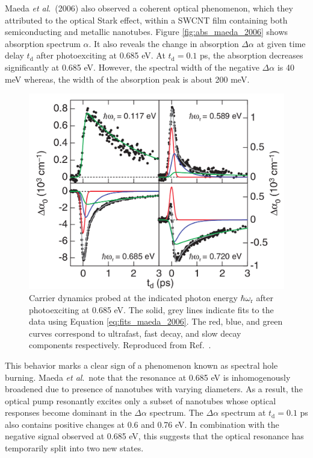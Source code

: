 \clearpage

Maeda \textit{et al}.\ (2006) also observed a coherent optical phenomenon, which they attributed to the optical Stark effect, within a SWCNT film containing both semiconducting and metallic nanotubes. Figure \ref{fig:abs_maeda_2006} shows absorption spectrum $\alpha$. It also reveals the change in absorption $\Delta \alpha$ at given time delay $t_\text{d}$ after photoexciting at 0.685 eV. At $t_\text{d} = 0.1$ ps, the absorption decreases significantly at 0.685 eV. However, the spectral width of the negative $\Delta\alpha$ is 40 meV whereas, the width of the absorption peak is about 200 meV.

\begin{figure}[H]
	\centering
	\includegraphics[scale=1.2]{images/chapter_prior_works/dtt_2_maeda_2006}
	\caption{Carrier dynamics probed at the indicated photon energy $\hbar \omega_\text{r}$ after photoexciting at 0.685 eV. The solid, grey lines indicate fits to the data using Equation \eqref{eq:fits_maeda_2006}. The red, blue, and green curves correspond to ultrafast, fast decay, and slow decay components respectively. Reproduced from Ref.\ \cite{maeda2006gigantic}.}
	\label{fig:dtt_2_maeda_2006}
\end{figure}

This behavior marks a clear sign of a phenomenon known as spectral hole burning. Maeda \textit{et al}.\ note that the resonance at 0.685 eV is inhomogenously broadened due to presence of nanotubes with varying diameters. As a result, the optical pump resonantly excites only a subset of nanotubes whose optical responses become dominant in the $\Delta \alpha$ spectrum. The $\Delta \alpha$ spectrum at $t_\text{d} = 0.1$ ps also contains positive changes at 0.6 and 0.76 eV. In combination with the negative signal observed at 0.685 eV, this suggests that the optical resonance has temporarily split into two new states.


